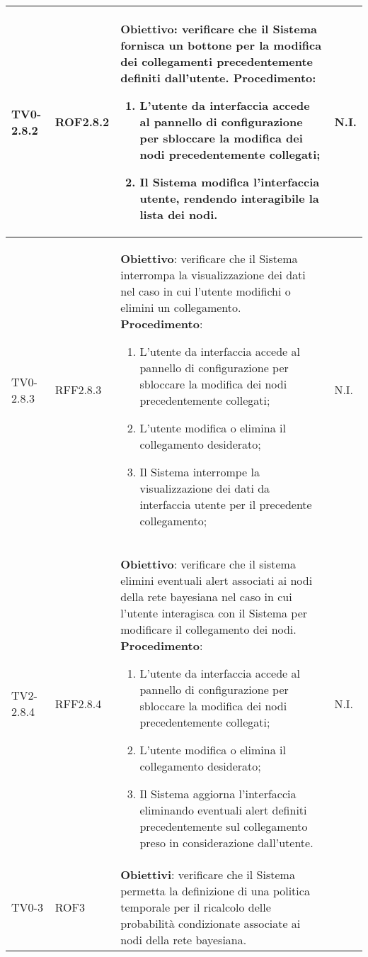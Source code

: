 \begin{longtable}{|C{.15\textwidth}|C{.13\textwidth}|m{.52\textwidth}|C{.08\textwidth}|}
\hline
{} TV0-2.8.2 & ROF2.8.2 &
	\textbf{Obiettivo}: verificare che il Sistema fornisca un bottone per la modifica dei collegamenti precedentemente definiti dall'utente. \newline
	\textbf{Procedimento}:
	\begin{enumerate}
		\item L'utente da interfaccia accede al pannello di configurazione per sbloccare la modifica dei nodi precedentemente collegati;
		\item Il Sistema modifica l'interfaccia utente, rendendo interagibile la lista dei nodi.
	\end{enumerate}
	& N.I. \\
\hline
TV0-2.8.3 & RFF2.8.3 &
	\textbf{Obiettivo}: verificare che il Sistema interrompa la visualizzazione dei dati nel caso in cui l'utente modifichi o elimini un collegamento. \newline
	\textbf{Procedimento}:
	\begin{enumerate}
		\item L'utente da interfaccia accede al pannello di configurazione per sbloccare la modifica dei nodi precedentemente collegati;
		\item L'utente modifica o elimina il collegamento desiderato;
		\item Il Sistema interrompe la visualizzazione dei dati da interfaccia utente per il precedente collegamento; 
	\end{enumerate}
	& N.I. \\
\hline
{} TV2-2.8.4 & RFF2.8.4 & 
	\textbf{Obiettivo}: verificare che il sistema elimini eventuali alert associati ai nodi della rete bayesiana nel caso in cui l'utente interagisca con il Sistema per modificare il collegamento dei nodi. \newline
	\textbf{Procedimento}: 
	\begin{enumerate}
		\item L'utente da interfaccia accede al pannello di configurazione per sbloccare la modifica dei nodi precedentemente collegati;
		\item L'utente modifica o elimina il collegamento desiderato;
		\item Il Sistema aggiorna l'interfaccia eliminando eventuali alert definiti precedentemente sul collegamento preso in considerazione dall'utente.
	\end{enumerate}
	& N.I. \\
\hline
TV0-3 & ROF3 &
	\textbf{Obiettivi}: verificare che il Sistema permetta la definizione di una politica temporale per il ricalcolo delle probabilità condizionate associate ai nodi della rete bayesiana. \newline

\end{longtable}
